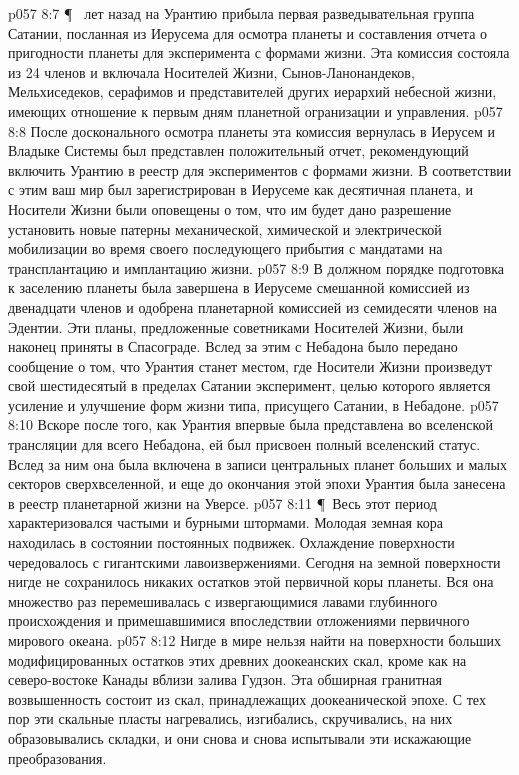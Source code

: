 \vs p057 8:7 \P\  лет назад на Урантию прибыла первая разведывательная группа Сатании, посланная из Иерусема для осмотра планеты и составления отчета о пригодности планеты для эксперимента с формами жизни. Эта комиссия состояла из 24 членов и включала Носителей Жизни, Сынов\hyp{}Ланонандеков, Мельхиседеков, серафимов и представителей других иерархий небесной жизни, имеющих отношение к первым дням планетной огранизации и управления.
\vs p057 8:8 После досконального осмотра планеты эта комиссия вернулась в Иерусем и Владыке Системы был представлен положительный отчет, рекомендующий включить Урантию в реестр для экспериментов с формами жизни. В соответствии с этим ваш мир был зарегистрирован в Иерусеме как десятичная планета, и Носители Жизни были оповещены о том, что им будет дано разрешение установить новые патерны механической, химической и электрической мобилизации во время своего последующего прибытия с мандатами на трансплантацию и имплантацию жизни.
\vs p057 8:9 В должном порядке подготовка к заселению планеты была завершена в Иерусеме смешанной комиссией из двенадцати членов и одобрена планетарной комиссией из семидесяти членов на Эдентии. Эти планы, предложенные советниками Носителей Жизни, были наконец приняты в Спасограде. Вслед за этим с Небадона было передано сообщение о том, что Урантия станет местом, где Носители Жизни произведут свой шестидесятый в пределах Сатании эксперимент, целью которого является усиление и улучшение форм жизни типа, присущего Сатании, в Небадоне.
\vs p057 8:10 Вскоре после того, как Урантия впервые была представлена во вселенской трансляции для всего Небадона, ей был присвоен полный вселенский статус. Вслед за ним она была включена в записи центральных планет больших и малых секторов сверхвселенной, и еще до окончания этой эпохи Урантия была занесена в реестр планетарной жизни на Уверсе.
\vs p057 8:11 \P\ Весь этот период характеризовался частыми и бурными штормами. Молодая земная кора находилась в состоянии постоянных подвижек. Охлаждение поверхности чередовалось с гигантскими лавоизвержениями. Сегодня на земной поверхности нигде не сохранилось никаких остатков этой первичной коры планеты. Вся она множество раз перемешивалась с извергающимися лавами глубинного происхождения и примешавшимися впоследствии отложениями первичного мирового океана.
\vs p057 8:12 Нигде в мире нельзя найти на поверхности больших модифицированных остатков этих древних доокеанских скал, кроме как на северо\hyp{}востоке Канады вблизи залива Гудзон. Эта обширная гранитная возвышенность состоит из скал, принадлежащих доокеанической эпохе. С тех пор эти скальные пласты нагревались, изгибались, скручивались, на них образовывались складки, и они снова и снова испытывали эти искажающие преобразования.
